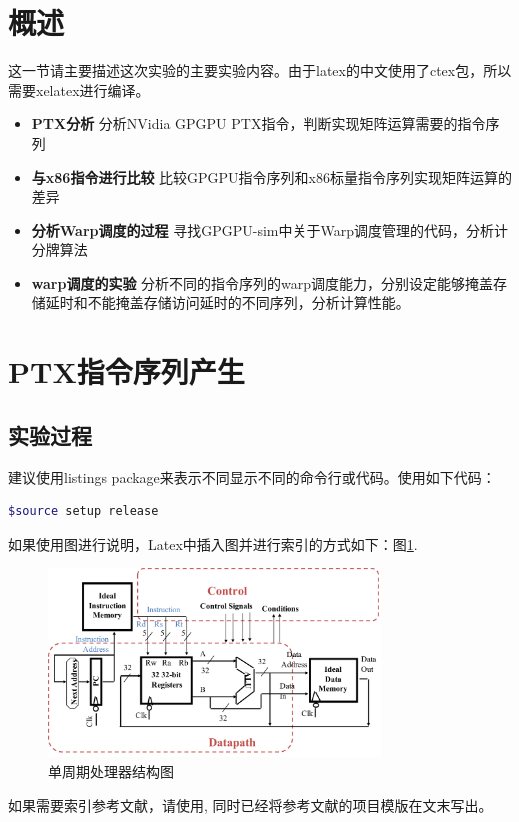 \documentclass[a4paper]{article}
\begin{document}

\section{概述} \label{overview}%
这一节请主要描述这次实验的主要实验内容。由于latex的中文使用了ctex包，所以需要xelatex进行编译。
\begin{itemize}
	\item{\textbf{PTX分析} 分析NVidia GPGPU PTX指令，判断实现矩阵运算需要的指令序列}
    \item{\textbf{与x86指令进行比较} 比较GPGPU指令序列和x86标量指令序列实现矩阵运算的差异}
    \item{\textbf{分析Warp调度的过程} 寻找GPGPU-sim中关于Warp调度管理的代码，分析计分牌算法}
    \item{\textbf{warp调度的实验} 分析不同的指令序列的warp调度能力，分别设定能够掩盖存储延时和不能掩盖存储访问延时的不同序列，分析计算性能。}
\end{itemize}


\newpage
\section{PTX指令序列产生}\label{sub:ptx}
\subsection{实验过程} \label{sub:ptxproc}
建议使用listings package来表示不同显示不同的命令行或代码。使用如下代码：
\begin{lstlisting}[language=bash]
$source setup release
\end{lstlisting}
如果使用图进行说明，Latex中插入图并进行索引的方式如下：图\ref{fig:singleblock}. 
\begin{figure}[ht]
 \centering
 \includegraphics[height=5cm]{images/l1sys.pdf}
 \caption{单周期处理器结构图}
 \label{fig:singleblock}
\end{figure}
如果需要索引参考文献，请使用\cite{Erdos01}, 同时已经将参考文献的项目模版在文末写出。
\end{document}
